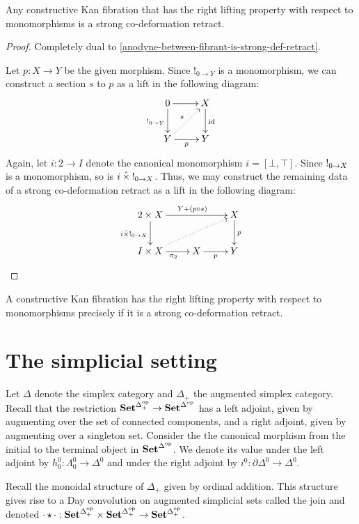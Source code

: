 \documentclass[reqno,10pt,a4paper,oneside]{amsart}
\begin{document}
\begin{lemma}
Any constructive Kan fibration that has the right lifting property with respect to monomorphisms is a strong co-deformation retract.
\end{lemma}

\begin{proof}
Completely dual to \cref{anodyne-between-fibrant-is-strong-def-retract}.

Let $p : X \to Y$ be the given morphism.
Since $!_{0 \to Y}$ is a monomorphism, we can construct a section $s$ to $p$ as a lift in the following diagram:
\[
\xymatrix{
  0
  \ar[r]
  \ar[d]_{\canonical_{0 \to Y}}
&
  X
  \ar[d]^{\id}
\\
  Y
  \ar[r]_{p}
  \ar@{.>}[ur]^{s}
&
  Y
}
\]
Again, let $i : 2 \to I$ denote the canonical monomorphism $i = [\bot, \top]$.
Since $\mathord{!}_{0 \to X}$ is a monomorphism, so is $i \mathbin{\hat{\times}} \mathord{!}_{0 \to X}$.
Thus, we may construct the remaining data of a strong co-deformation retract as a lift in the following diagram:
\[
\xymatrix{
  2 \times X
  \ar[rr]^{Y + (p \cc s)}
  \ar[d]_{i \hattimes \canonical_{0 \to X}}
&&
  X
  \ar[d]^{p}
\\
  I \times X
  \ar[r]_{\pi_2}
  \ar@{.>}[urr]
&
  X
  \ar[r]_{p}
&
  Y
}
\]
\end{proof}

\begin{corollary}
A constructive Kan fibration has the right lifting property with respect to monomorphisms precisely if it is a strong co-deformation retract.
\end{corollary}

\section{The simplicial setting}

Let $\Delta$ denote the simplex category and $\Delta_+$ the augmented simplex category.
Recall that the restriction $\mathbf{Set}^{\Delta_+^{\mathrm{op}}} \to \mathbf{Set}^{\Delta^{\mathrm{op}}}$ has a left adjoint, given by augmenting over the set of connected components, and a right adjoint, given by augmenting over a singleton set.
Consider the the canonical morphism from the initial to the terminal object in $\mathbf{Set}^{\Delta^{\mathrm{op}}}$.
We denote its value under the left adjoint by $h_0^0 : \Lambda_0^0 \to \Delta^0$ and under the right adjoint by $i^0 : \partial \Delta^0 \to \Delta^0$.

Recall the monoidal structure of $\Delta_+$ given by ordinal addition.
This structure gives rise to a Day convolution on augmented simplicial sets called the join and denoted $\mathop{\cdot} \star \mathop{\cdot} : \mathbf{Set}^{\Delta_+^{\mathrm{op}}} \times \mathbf{Set}^{\Delta_+^{\mathrm{op}}} \to \mathbf{Set}^{\Delta_+^{\mathrm{op}}}$.
\end{document}
